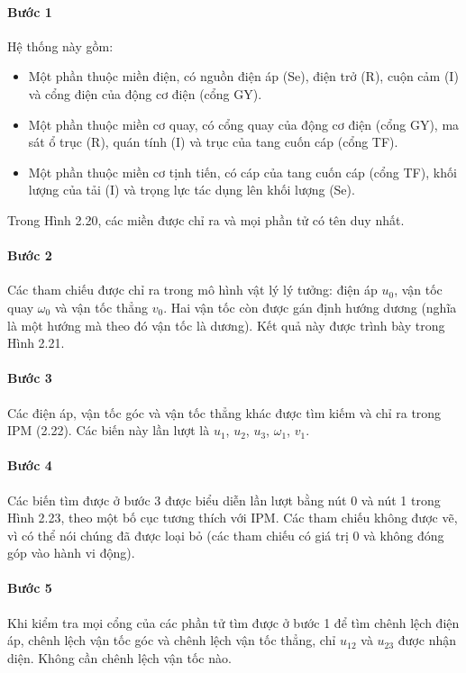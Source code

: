 \paragraph{Bước 1}
Hệ thống này gồm:
\begin{itemize}
\item Một phần thuộc miền điện, có nguồn điện áp (Se), điện trở (R), cuộn cảm (I) và cổng điện của động cơ điện (cổng GY).
\item Một phần thuộc miền cơ quay, có cổng quay của động cơ điện (cổng GY), ma sát ổ trục (R), quán tính (I) và trục của tang cuốn cáp (cổng TF).
\item Một phần thuộc miền cơ tịnh tiến, có cáp của tang cuốn cáp (cổng TF), khối lượng của tải (I) và trọng lực tác dụng lên khối lượng (Se).
\end{itemize}
Trong Hình 2.20, các miền được chỉ ra và mọi phần tử có tên duy nhất.

\paragraph{Bước 2}
Các tham chiếu được chỉ ra trong mô hình vật lý lý tưởng: điện áp $u_0$, vận tốc quay $\omega_0$ và vận tốc thẳng $v_0$. Hai vận tốc còn được gán định hướng dương (nghĩa là một hướng mà theo đó vận tốc là dương). Kết quả này được trình bày trong Hình 2.21.
\paragraph{Bước 3}
Các điện áp, vận tốc góc và vận tốc thẳng khác được tìm kiếm và chỉ ra trong IPM (2.22). Các biến này lần lượt là $u_1$, $u_2$, $u_3$, $\omega_1$, $v_1$.

\paragraph{Bước 4}
Các biến tìm được ở bước 3 được biểu diễn lần lượt bằng nút 0 và nút 1 trong Hình 2.23, theo một bố cục tương thích với IPM. Các tham chiếu không được vẽ, vì có thể nói chúng đã được loại bỏ (các tham chiếu có giá trị 0 và không đóng góp vào hành vi động).

\paragraph{Bước 5}
Khi kiểm tra mọi cổng của các phần tử tìm được ở bước 1 để tìm chênh lệch điện áp, chênh lệch vận tốc góc và chênh lệch vận tốc thẳng, chỉ $u_{12}$ và $u_{23}$ được nhận diện. Không cần chênh lệch vận tốc nào.

